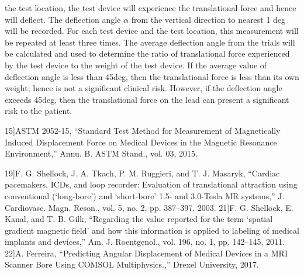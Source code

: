 the test location, the test device will experience the
translational force and hence will deflect. The deflection angle $\alpha$ from the vertical direction to nearest 1 deg will be recorded.
For each test device and the test location, this measurement will be repeated at least three times. The average deflection
angle from the trials will be calculated and used to determine the ratio of translational force experienced by the test device
to the weight of the test device. If the average value of deflection angle is less than 45deg, then the translational force is less
than its own weight; hence is not a significant clinical risk. However, if the deflection angle exceeds 45deg, then the
translational force on the lead can present a significant risk to the patient.


15]ASTM 2052-15, “Standard Test Method for Measurement of Magnetically Induced Displacement Force on
Medical Devices in the Magnetic Resonance Environment,” Annu. B. ASTM Stand., vol. 03, 2015.

19]F. G. Shellock, J. A. Tkach, P. M. Ruggieri, and T. J. Masaryk, “Cardiac pacemakers, ICDs, and loop recorder:
Evaluation of translational attraction using conventional (‘long-bore’) and ‘short-bore’ 1.5- and 3.0-Tesla MR
systems,” J. Cardiovasc. Magn. Reson., vol. 5, no. 2, pp. 387–397, 2003.
21]F. G. Shellock, E. Kanal, and T. B. Gilk, “Regarding the value reported for the term ‘spatial gradient magnetic field’
and how this information is applied to labeling of medical implants and devices,” Am. J. Roentgenol., vol. 196, no.
1, pp. 142–145, 2011.
22]A. Ferreira, “Predicting Angular Displacement of Medical Devices in a MRI Scanner Bore Using COMSOL
Multiphysics.,” Drexel University, 2017.